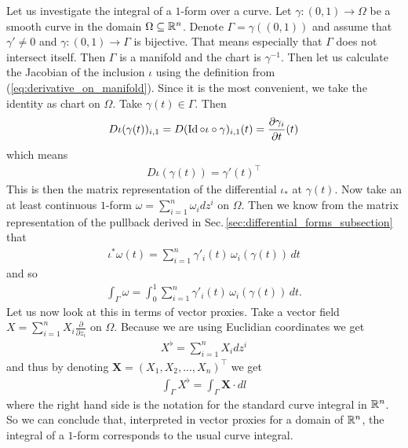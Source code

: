 \documentclass[../master_thesis.tex]{subfiles}
\begin{document}
\begin{example}\label{ex:integration_1_forms}
    Let us investigate the integral of a $1$-form over a curve. 
    Let $\gamma: (0,1) \rightarrow \Omega$ be a smooth curve in the domain $\Omega 
    \subseteq \mathbb{R}^n$. Denote $\Gamma = \gamma((0,1))$ and assume that 
    $\gamma' \neq 0$ and $\gamma: (0,1) \rightarrow \Gamma$ is bijective.
    That means especially that $\Gamma$ does not intersect itself.
    Then $\Gamma$ is a manifold and the chart is $\gamma^{-1}$.
    Then let us calculate the Jacobian of the inclusion $\iota$ using the 
    definition from (\ref{eq:derivative_on_manifold}). 
    Since it is the most convenient, we take the 
    identity as chart on $\Omega$. Take $\gamma(t) \in \Gamma$. Then
    \begin{align*}
        D\iota(\gamma(t))_{i,1} = D(\operatorname{Id} \circ \iota \circ \gamma)_{i,1}(t)
        = \frac{\partial \gamma_i}{\partial t}(t)
    \end{align*} 
    which means
    \begin{align*}
        D\iota(\gamma(t)) = \gamma'(t)^\top
    \end{align*}
    This is then the matrix representation of the differential $\iota_*$ at 
    $\gamma(t)$.
    Now take an at least continuous $1$-form $\omega = \sum_{i=1}^n \omega_i dz^i$ 
    on $\Omega$. Then we know from the matrix representation of the 
    pullback derived in Sec.\,\ref{sec:differential_forms_subsection} that 
    \begin{align*}
        \iota^*\omega (t) = \sum_{i=1}^n \gamma'_i(t) \, \omega_i(\gamma(t)) \,dt
    \end{align*}
    and so
    \begin{align*}
        \int_\Gamma \omega = \int_0^1\sum_{i=1}^n \gamma'_i(t) \, \omega_i(\gamma(t)) \,dt.
    \end{align*}
    Let us now look at this in terms of vector proxies. Take a vector field 
    $X = \sum_{i=1}^n X_i \frac{\partial}{\partial z_i}$ on $\Omega$.
    Because we are using Euclidian coordinates we get
    \begin{align*}
        X^\flat = \sum_{i=1}^n X_i dz^i
    \end{align*}
    and thus by denoting $\mathbf{X} = (X_1, X_2, ..., X_n)^\top$ we get
    \begin{align*}
        \int_\Gamma X^\flat = \int_\Gamma \mathbf{X}\cdot dl
    \end{align*}
    where the right hand side is the notation for the standard curve integral 
    in $\mathbb{R}^n$. So we can conclude that, interpreted in vector proxies for 
    a domain of $\mathbb{R}^n$, the integral of a $1$-form corresponds to the usual 
    curve integral.
\end{example}
\end{document}
